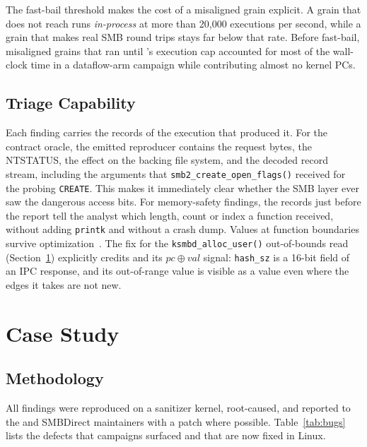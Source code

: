 \documentclass{article}
\begin{document}
The fast-bail threshold makes the cost of a misaligned grain explicit. A grain
that does not reach \ksmbd runs \emph{in-process} at more than 20{,}000
executions per second, while a grain that makes real SMB round trips stays far
below that rate. Before fast-bail, misaligned grains that ran until
\libfuzzer's execution cap accounted for most of the wall-clock time in a
dataflow-arm campaign while contributing almost no kernel PCs.

\subsection{Triage Capability}

Each finding carries the \kcovdf records of the execution that produced it.
For the contract oracle, the emitted reproducer contains the request bytes,
the NTSTATUS, the effect on the backing file system, and the decoded record
stream, including the arguments that \texttt{smb2\_create\_open\_flags()}
received for the probing \texttt{CREATE}. This makes it immediately clear
whether the SMB layer ever saw the dangerous access bits. For memory-safety
findings, the records just before the \kasan report tell the analyst which
length, count or index a function received, without adding \texttt{printk}
and without a crash dump. Values at function boundaries survive
optimization~\cite{kim2026kcovdataflow}. The fix for the
\texttt{ksmbd\_alloc\_user()} out-of-bounds read
(Section~\ref{sec:realworld}) explicitly credits \toolname and its
$\mathit{pc}\oplus\mathit{val}$ signal: \texttt{hash\_sz} is a 16-bit field
of an IPC response, and its out-of-range value is visible as a value even
where the edges it takes are not new.


\section{Case Study}\label{sec:realworld}

\subsection{Methodology}

All findings were reproduced on a sanitizer kernel, root-caused, and reported
to the \ksmbd and SMBDirect maintainers with a patch where possible.
Table~\ref{tab:bugs} lists the defects that \toolname campaigns surfaced and
that are now fixed in Linux.
\end{document}
